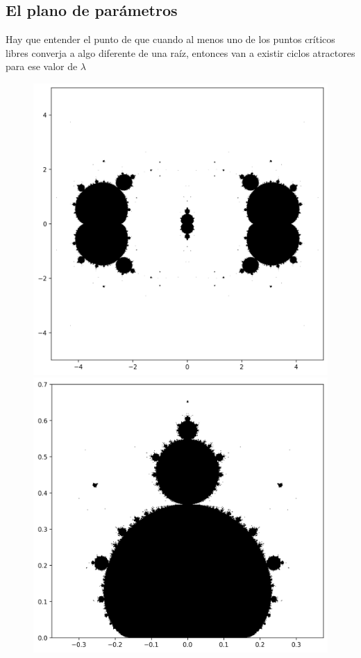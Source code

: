 \subsection{El plano de parámetros}

Hay que entender el punto de que cuando al menos uno de los puntos críticos libres converja a algo diferente de una raíz, entonces  van a existir ciclos atractores para ese valor de $\lambda$

\begin{figure}[H]
\centering 
\begin{minipage}[t]{0.48\textwidth}
\centering
\includegraphics[width=\textwidth]{img/plano_param_sch_2.png}
\end{minipage}\hfill
\begin{minipage}[t]{0.48\textwidth}
\centering
\includegraphics[width=\textwidth]{img/plano_param_sch_1.png}

\end{minipage}
\end{figure}
